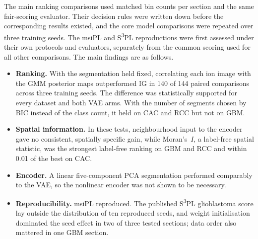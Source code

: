 The main ranking comparisons used matched bin counts per section and the same
fair-scoring evaluator. Their decision rules were written down before the
corresponding results existed, and the core model comparisons were repeated
over three training seeds. The msiPL and S\textsuperscript{3}PL reproductions were
first assessed under their own protocols and evaluators, separately from the
common scoring used for all other comparisons.
The main findings are as follows.
\begin{itemize}
  \item \textbf{Ranking.} With the segmentation held fixed, correlating each
        ion image with the GMM posterior maps outperformed IG in 140 of 144
        paired comparisons across three training seeds. The difference was
        statistically supported for every dataset and both VAE arms. With the
        number of segments chosen by BIC instead of the class count, it held
        on CAC and RCC but not on GBM.
  \item \textbf{Spatial information.} In these tests, neighbourhood input to
        the encoder gave no consistent, spatially specific gain, while
        Moran's~$I$, a label-free spatial statistic, was the strongest
        label-free ranking on GBM and RCC and within 0.01 of the best on CAC.
  \item \textbf{Encoder.} A linear five-component PCA segmentation performed
        comparably to the VAE, so the nonlinear encoder was not shown to be
        necessary.
  \item \textbf{Reproducibility.} msiPL reproduced. The published S\textsuperscript{3}PL
        glioblastoma score lay outside the distribution of ten reproduced
        seeds, and weight initialisation dominated the seed effect in two of
        three tested sections; data order also mattered in one GBM section.
\end{itemize}

